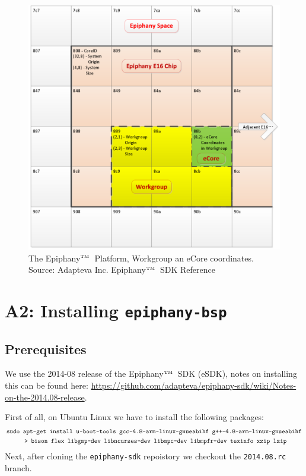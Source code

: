 \documentclass[fleqn]{article}
\renewcommand{\(}{\left(}
\renewcommand{\)}{\right)}
\def\tm{$^{\hbox{\tiny TM}}$~}
\begin{document}
\begin{centering}
\begin{figure}
\centering
\includegraphics[scale=0.5]{EpiphanySpace.pdf}
\caption{The Epiphany\tm Platform, Workgroup an eCore coordinates. Source: Adapteva Inc. Epiphany\tm SDK Reference}
\end{figure}
\end{centering}

\section{A2: Installing \texttt{epiphany-bsp}}

\subsection{Prerequisites}

We use the 2014-08 release of the Epiphany\tm SDK (eSDK), notes on installing this can be found here: \url{https://github.com/adapteva/epiphany-sdk/wiki/Notes-on-the-2014.08-release}.

First of all, on Ubuntu Linux we have to install the following packages:
\begin{align*} 
    &\texttt{sudo apt-get install u-boot-tools gcc-4.8-arm-linux-gnueabihf g++-4.8-arm-linux-gnueabihf} \\
    &\texttt{\hspace{1 cm}> bison flex libgmp-dev libncurses-dev libmpc-dev libmpfr-dev texinfo xzip lzip}
\end{align*}
Next, after cloning the \verb+epiphany-sdk+ repoistory we checkout the \texttt{2014.08.rc} branch.
\end{document}
